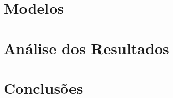 \documentclass[12pt]{report} %
\begin{document}
\chapter{Modelos}
\label{cap:model}


\chapter{Análise dos Resultados}
\label{cap:resul}


\chapter{Conclusões}
\label{cap:concl}



\appendix



% 
% 
% 
% 
% 
% 
% 
% 
% 
% 
% 
% 
% 
% 
% 
% 
% 
% 
% 
% 
% 
% 
% 
% 
% 
% 
% 
% 
% 
% 
% 
% 
% 



\end{document}
